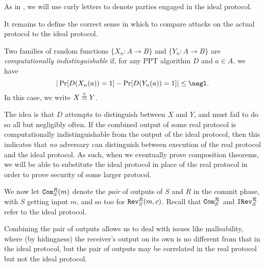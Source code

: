 \begin{ntn}
	As in , we will use curly letters to denote
	parties engaged in the ideal protocol.
\end{ntn}

\noindent
It remains to define the correct sense in which to compare attacks on the actual
protocol to the ideal protocol.

\begin{dfn}\label{def:computataional indistinguishability}
	Two families of random functions $\{X_n: A\rightarrow B\}$ and $\{Y_n:
		A\rightarrow B\}$ are \emph{computationally indistinguishable} if, for any
	PPT algorithm $D$ and $a\in A$, we have\[
		|\Pr[D(X_n(a)) = 1] - \Pr[D(Y_n(a)) = 1]| \leq \negl.
	\]In this case, we write $X\overset{\text{c}}{\equiv} Y$.
\end{dfn}

\noindent
The idea is that $D$ attempts to distinguish between $X$ and $Y$, and must fail
to do so all but negligibly often. If the combined output of some real protocol is
computationally indistinguishable from the output of the ideal protocol, then
this indicates that \emph{no} adversary can distinguish between execution of the real
protocol and the ideal protocol. As such, when we eventually prove composition
theorems, we will be able to substitute the ideal protocol in place of the real
protocol in order to prove security of some larger protocol.

\begin{ntn}
	We now let ${\texttt{Com}}_S^R(m)$ denote the \emph{pair} of outputs of $S$ and $R$
	in the commit phase, with $S$ getting input $m$, and so too for
	${\texttt{Rev}}_S^R(m, c)$. Recall that ${\texttt{Com}}_{\mathcal{S}}^{\mathcal{R}}$ and
	${\texttt{IRev}}_{\mathcal{S}}^{\mathcal{R}}$ refer to the ideal protocol.
\end{ntn}

\noindent
Combining the pair of outputs allows us to deal with issues like malleability,
where (by hidingness) the receiver's output on its own is no different from that
in the ideal protocol, but the pair of outputs may be correlated in the real
protocol but not the ideal protocol.

